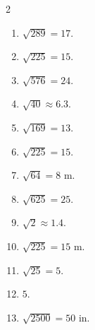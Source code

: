 \documentclass[11pt]{article}
\begin{document}
\begin{keybox}
\begin{multicols}{2}
\small
\begin{enumerate}[leftmargin=*,itemsep=3pt]
  \item $\sqrt{289}=17$.
  \item $\sqrt{225}=15$.
  \item $\sqrt{576}=24$.
  \item $\sqrt{40}\approx6.3$.
  \item $\sqrt{169}=13$.
  \item $\sqrt{225}=15$.
  \item $\sqrt{64}=8$ m.
  \item $\sqrt{625}=25$.
  \item $\sqrt{2}\approx1.4$.
  \item $\sqrt{225}=15$ m.
  \item $\sqrt{25}=5$.
  \item $5$.
  \item $\sqrt{2500}=50$ in.
\end{enumerate}
\end{multicols}
\end{keybox}
\end{document}
